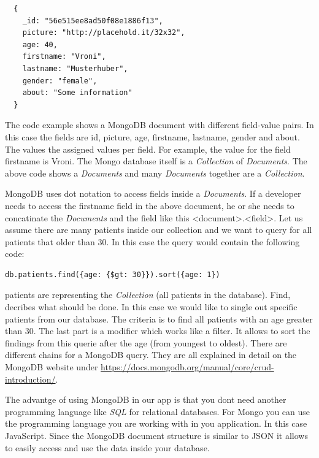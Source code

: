 \begin{verbatim}
  {
    _id: "56e515ee8ad50f08e1886f13",
    picture: "http://placehold.it/32x32",
    age: 40,
    firstname: "Vroni",
    lastname: "Musterhuber",
    gender: "female",
    about: "Some information"
  }
\end{verbatim}

The code example shows a MongoDB document with different field-value pairs. In this case the fields are id, picture, age, firstname, lastname, gender and
about. The values the assigned values per field. For example, the value for the field firstname is Vroni. The Mongo database itself is a \textit{Collection}
of \textit{Documents}. The above code shows a \textit{Documents} and many \textit{Documents} together are a \textit{Collection}.

MongoDB uses dot notation to access fields inside a \textit{Documents}. If a developer needs to access the firstname field in the above document, he or she
needs to concatinate the \textit{Documents} and the field like this <document>.<field>. Let us assume there are many patients inside our collection and we
want to query for all patients that older than 30. In this case the query would contain the following code:

\begin{verbatim}
db.patients.find({age: {$gt: 30}}).sort({age: 1})
\end{verbatim}

patients are representing the \textit{Collection} (all patients in the database). Find, decribes what should be done. In this
case we would like to single out specific patients from our database. The criteria is to find all patients with an age greater than 30. The last part is
a modifier which works like a filter. It allows to sort the findings from this querie after the age (from youngest to oldest). There are different
chains for a MongoDB query. They are all explained in detail on the MongoDB website under \url{https://docs.mongodb.org/manual/core/crud-introduction/}.

The advantge of using MongoDB in our app is that you dont need another programming language like \textit{SQL} for relational databases.
For Mongo you can use the programming language you are working with in you application. In this case JavaScript. Since the MongoDB document structure is
similar to JSON it allows to easily access and use the data inside your database. \cite{chodorow2013mongodb}


